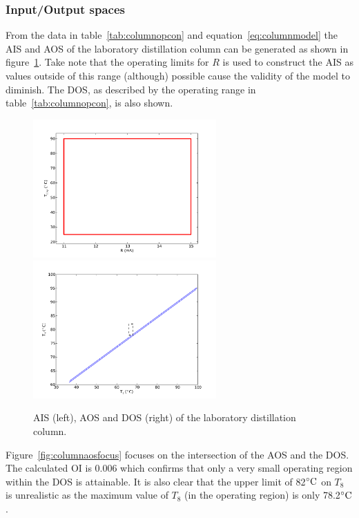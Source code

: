 \subsubsection{Input/Output spaces}
From the data in table~\ref{tab:columnopcon} and equation~\ref{eq:columnmodel} the AIS and AOS of the laboratory distillation column can be generated as shown in figure~\ref{fig:columnaisaos}.
Take note that the operating limits for $R$ is used to construct the AIS as values outside of this range (although) possible cause the validity of the model to diminish.
The DOS, as described by the operating range in table~\ref{tab:columnopcon}, is also shown.

\begin{figure}[htbp]
  \centering
    \includegraphics[width=7cm]{graph/columnais.pdf}
    \qquad
    \includegraphics[width=7cm]{graph/columnaos.pdf}
  \caption[AIS, AOS and DOS of the laboratory distillation column]{AIS (left), AOS and DOS (right) of the laboratory distillation column.}
  \label{fig:columnaisaos}
\end{figure}

Figure~\ref{fig:columnaosfocus} focuses on the intersection of the AOS and the DOS.
The calculated OI is 0.006 which confirms that only a very small operating region within the DOS is attainable.
It is also clear that the upper limit of 82$^{\circ}\text{{C}}$ on $T_8$ is unrealistic as the maximum value of $T_8$ (in the operating region) is only 78.2$^{\circ}\text{{C}}$.

